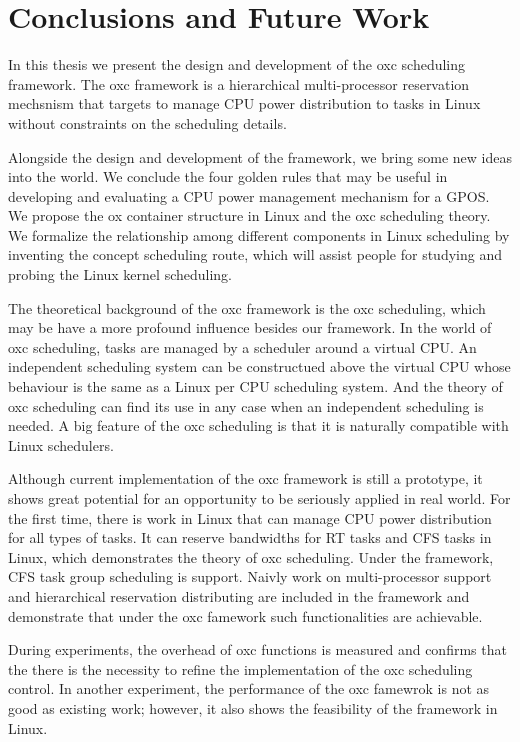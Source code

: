 \chapter{Conclusions and Future Work\label{chap:con}}
In this thesis we present the design and development of the oxc scheduling
framework. The oxc framework is a hierarchical multi-processor reservation 
mechsnism that targets to manage CPU power distribution to tasks in Linux
without constraints on the scheduling details. 

Alongside the design and development of the framework, we bring some
new ideas into the world. We conclude the four golden rules that may
be useful in developing and evaluating a CPU power management 
mechanism for a GPOS. We propose the ox container structure in Linux
and the oxc scheduling theory. We formalize the relationship among
different components in Linux scheduling by inventing the concept
scheduling route, which will assist people for studying and probing
the Linux kernel scheduling.

The theoretical background of the oxc framework is the oxc scheduling,
which may be have a more profound influence besides our framework. 
In the world of oxc scheduling, tasks are managed by a scheduler around 
a virtual CPU. An independent scheduling system can be constructued 
above the virtual CPU whose behaviour is the same as a Linux per CPU
scheduling system. And the theory of oxc scheduling can find its use in
any case when an independent scheduling is needed. A big feature of the 
oxc scheduling is that it is naturally compatible with Linux schedulers. 

Although current implementation of the oxc framework is still a prototype,
it shows great potential for an opportunity to be seriously applied in real
world. For the first time, there is work in Linux that can manage CPU power
distribution for all types of tasks. It can reserve bandwidths for RT tasks
and CFS tasks in Linux, which demonstrates the theory of oxc scheduling. 
Under the framework, CFS task group scheduling is support.
Naivly work on multi-processor support and hierarchical reservation 
distributing are included in the framework and demonstrate that under 
the oxc famework such functionalities are achievable.  

During experiments, the overhead of oxc functions is measured and 
confirms that the there is the necessity to refine the implementation
of the oxc scheduling control. In another experiment, the performance of
the oxc famewrok is not as good as existing work; however, it also shows
the feasibility of the framework in Linux.

